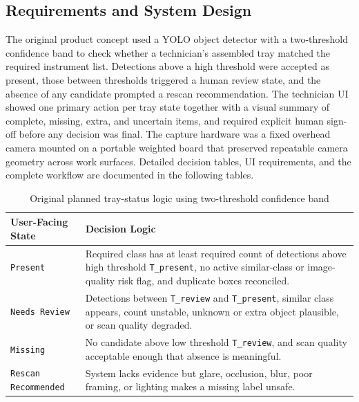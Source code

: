\documentclass[10pt,a4paper]{article}
\begin{document}
\subsection{Requirements and System Design}
\label{sec:requirements-and-system-design}

The original product concept used a YOLO object detector with a two-threshold
confidence band to check whether a technician's assembled tray matched the
required instrument list. Detections above a high threshold were accepted as
present, those between thresholds triggered a human review state, and the
absence of any candidate prompted a rescan recommendation. The technician UI
showed one primary action per tray state together with a visual summary of
complete, missing, extra, and uncertain items, and required explicit human
sign-off before any decision was final. The capture hardware was a fixed
overhead camera mounted on a portable weighted board that preserved repeatable
camera geometry across work surfaces. Detailed decision tables, UI
requirements, and the complete workflow are documented in
the following tables.

\begin{table}[H]
\centering
\caption{Original planned tray-status logic using two-threshold confidence band}
\label{tab:original-planned-tray-status-logic}
\small\renewcommand{\arraystretch}{1.2}\setlength{\tabcolsep}{4pt}
\begin{tabularx}{\textwidth}{|>{\raggedright\arraybackslash}X|>{\raggedright\arraybackslash}X|}
\hline
User-Facing State & Decision Logic \\
\hline
\texttt{Present} & Required class has at least required count of detections above high threshold \texttt{T\_present}, no active similar-class or image-quality risk flag, and duplicate boxes reconciled. \\
\hline
\texttt{Needs Review} & Detections between \texttt{T\_review} and \texttt{T\_present}, similar class appears, count unstable, unknown or extra object plausible, or scan quality degraded. \\
\hline
\texttt{Missing} & No candidate above low threshold \texttt{T\_review}, and scan quality acceptable enough that absence is meaningful. \\
\hline
\texttt{Rescan Recommended} & System lacks evidence but glare, occlusion, blur, poor framing, or lighting makes a missing label unsafe. \\
\hline
\end{tabularx}
\end{table}
\end{document}
